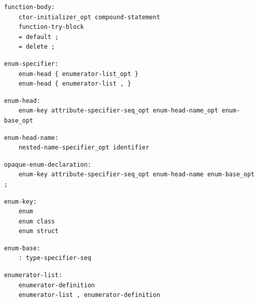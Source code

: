 \noindent\textbf{\texttt{}}\par
\begin{lstlisting}
function-body:
    ctor-initializer_opt compound-statement
    function-try-block
    = default ;
    = delete ;
\end{lstlisting}

\noindent\textbf{\texttt{}}\par
\begin{lstlisting}
enum-specifier:
    enum-head { enumerator-list_opt }
    enum-head { enumerator-list , }
\end{lstlisting}

\noindent\textbf{\texttt{}}\par
\begin{lstlisting}
enum-head:
    enum-key attribute-specifier-seq_opt enum-head-name_opt enum-base_opt
\end{lstlisting}

\noindent\textbf{\texttt{}}\par
\begin{lstlisting}
enum-head-name:
    nested-name-specifier_opt identifier
\end{lstlisting}

\noindent\textbf{\texttt{}}\par
\begin{lstlisting}
opaque-enum-declaration:
    enum-key attribute-specifier-seq_opt enum-head-name enum-base_opt ;
\end{lstlisting}

\noindent\textbf{\texttt{}}\par
\begin{lstlisting}
enum-key:
    enum
    enum class
    enum struct
\end{lstlisting}

\noindent\textbf{\texttt{}}\par
\begin{lstlisting}
enum-base:
    : type-specifier-seq
\end{lstlisting}

\noindent\textbf{\texttt{}}\par
\begin{lstlisting}
enumerator-list:
    enumerator-definition
    enumerator-list , enumerator-definition
\end{lstlisting}

